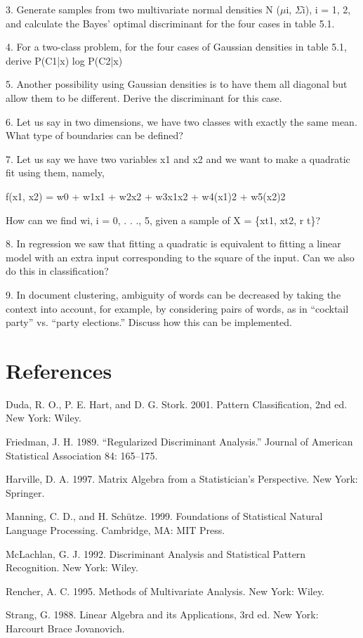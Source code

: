 3. Generate samples from two multivariate normal densities N ($\mu$i, $\Sigma$i), i = 1, 2, and calculate the Bayes’ optimal discriminant for the four cases in table 5.1.

4. For a two-class problem, for the four cases of Gaussian densities in table 5.1, derive P(C1|x) log P(C2|x)

5. Another possibility using Gaussian densities is to have them all diagonal but allow them to be different. Derive the discriminant for this case.

6. Let us say in two dimensions, we have two classes with exactly the same mean. What type of boundaries can be defined?

7. Let us say we have two variables x1 and x2 and we want to make a quadratic fit using them, namely,

f(x1, x2) = w0 + w1x1 + w2x2 + w3x1x2 + w4(x1)2 + w5(x2)2

How can we find wi, i = 0, . . ., 5, given a sample of X = \{xt1, xt2, r t\}?

8. In regression we saw that fitting a quadratic is equivalent to fitting a linear model with an extra input corresponding to the square of the input. Can we also do this in classification?

9. In document clustering, ambiguity of words can be decreased by taking the context into account, for example, by considering pairs of words, as in “cocktail party” vs. “party elections.” Discuss how this can be implemented.

\section{References}

Duda, R. O., P. E. Hart, and D. G. Stork. 2001. Pattern Classification, 2nd ed. New York: Wiley.

Friedman, J. H. 1989. “Regularized Discriminant Analysis.” Journal of American Statistical Association 84: 165--175.

Harville, D. A. 1997. Matrix Algebra from a Statistician’s Perspective. New York: Springer.

Manning, C. D., and H. Schütze. 1999. Foundations of Statistical Natural Language Processing. Cambridge, MA: MIT Press.

McLachlan, G. J. 1992. Discriminant Analysis and Statistical Pattern Recognition. New York: Wiley.

Rencher, A. C. 1995. Methods of Multivariate Analysis. New York: Wiley.

Strang, G. 1988. Linear Algebra and its Applications, 3rd ed. New York: Harcourt Brace Jovanovich.
